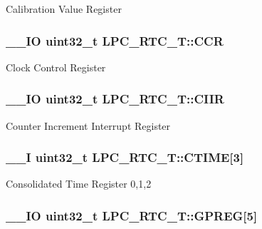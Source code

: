 Calibration Value Register \hypertarget{struct_l_p_c___r_t_c___t_ab2117371a628879dbc56f2c1774207b5}{
\subsubsection[{C\+C\+R}]{\setlength{\rightskip}{0pt plus 5cm}\+\_\+\+\_\+\+I\+O uint32\+\_\+t L\+P\+C\+\_\+\+R\+T\+C\+\_\+\+T\+::\+C\+C\+R}}\label{struct_l_p_c___r_t_c___t_ab2117371a628879dbc56f2c1774207b5}
Clock Control Register \hypertarget{struct_l_p_c___r_t_c___t_ac9d2627afcf203dccde2675c6c74d673}{
\subsubsection[{C\+I\+I\+R}]{\setlength{\rightskip}{0pt plus 5cm}\+\_\+\+\_\+\+I\+O uint32\+\_\+t L\+P\+C\+\_\+\+R\+T\+C\+\_\+\+T\+::\+C\+I\+I\+R}}\label{struct_l_p_c___r_t_c___t_ac9d2627afcf203dccde2675c6c74d673}
Counter Increment Interrupt Register \hypertarget{struct_l_p_c___r_t_c___t_a66b166ccd4abefe149e6e3ef6d833554}{
\subsubsection[{C\+T\+I\+M\+E}]{\setlength{\rightskip}{0pt plus 5cm}\+\_\+\+\_\+\+I uint32\+\_\+t L\+P\+C\+\_\+\+R\+T\+C\+\_\+\+T\+::\+C\+T\+I\+M\+E\mbox{[}3\mbox{]}}}\label{struct_l_p_c___r_t_c___t_a66b166ccd4abefe149e6e3ef6d833554}
Consolidated Time Register 0,1,2 \hypertarget{struct_l_p_c___r_t_c___t_a6624a04c6db73e0f9e53a9bc3cf50c1a}{
\subsubsection[{G\+P\+R\+E\+G}]{\setlength{\rightskip}{0pt plus 5cm}\+\_\+\+\_\+\+I\+O uint32\+\_\+t L\+P\+C\+\_\+\+R\+T\+C\+\_\+\+T\+::\+G\+P\+R\+E\+G\mbox{[}5\mbox{]}}}\label{struct_l_p_c___r_t_c___t_a6624a04c6db73e0f9e53a9bc3cf50c1a}
